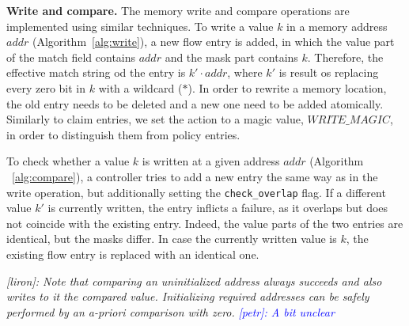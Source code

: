 \documentclass[conference]{sigcomm-alternate}
\newcommand{\concat}[0]{\cdot}
\newcommand{\compare}{compare\xspace}
\newcommand{\memwrite}{write\xspace}
\newcommand{\addr}{\textit{addr}\xspace}
\newcommand{\checko}{\texttt{check\_overlap}\xspace}
\newcommand{\liron}[1]{\textit{\textcolor{mypurple}{[liron]: #1}}} %
\newcommand{\petr}[1]{\textit{\textcolor{blue}{[petr]: #1}}} %
\newcommand{\memmagic}{\textit{WRITE\_MAGIC}}
\begin{document}
\vspace{1mm}
\noindent\textbf{Write and compare.}
The memory \memwrite and \compare
 operations are implemented using similar techniques.
To write a value $k$ in a memory address $\addr$ (Algorithm~\ref{alg:write}), a new flow entry is
added, in which the value part of the match field contains $\addr$ and
the mask part contains $k$. 
Therefore, the effective match string od the entry 
 is $k'\concat \addr$, where $k'$ is result os replacing every zero bit in $k$ with a wildcard ($*$).
  In order to rewrite a memory location, the old entry needs to be deleted and a new one need to be added atomically.
Similarly to claim entries, we set the action to a magic value,
$\memmagic$, in order to distinguish them from policy entries.

To check whether a value $k$ is written at a given
address $\addr$ (Algorithm ~\ref{alg:compare}),
a controller tries to add a new entry the same way as in the \memwrite operation,
but additionally setting the \texttt{\checko} flag. 
If a different value $k'$ is currently written, 
the entry inflicts a failure, as it overlaps but does not coincide
with the existing entry.
Indeed, the value parts of the two entries are identical, but the
masks differ.
In case the currently written value is $k$, the existing flow entry is replaced
with an identical one.

\liron{Note that comparing an uninitialized address always succeeds and also writes to it the compared value. Initializing required addresses can be safely performed by an a-priori comparison with zero.}
\petr{A bit unclear}

\end{document}
